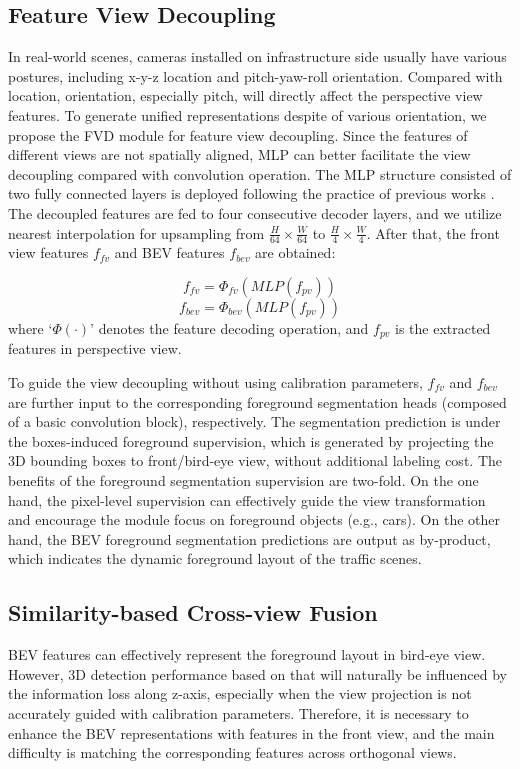 \documentclass[letterpaper, 10 pt, conference]{ieeeconf}
\begin{document}
\subsection{Feature View Decoupling}
In real-world scenes, cameras installed on infrastructure side usually have various postures, including x-y-z location and pitch-yaw-roll orientation. Compared with location, orientation, especially pitch, will directly affect the perspective view features. To generate unified representations despite of various orientation, we propose the FVD module for feature view decoupling. Since the features of different views are not spatially aligned, MLP can better facilitate the view decoupling compared with convolution operation. The MLP structure consisted of two fully connected layers is deployed following the practice of previous works \cite{pan2020cross, pyva}. The decoupled features are fed to four consecutive decoder layers, and we utilize nearest interpolation for upsampling from $\frac{H}{64} \times \frac{W}{64}$ to $\frac{H}{4} \times \frac{W}{4}$. After that, the front view features $f_{fv}$ and BEV features $f_{bev}$ are obtained:

\begin{equation}
  f_{fv} = \Phi_{fv}(\mathit{MLP}(f_{pv}))
\end{equation}
\begin{equation}
  f_{bev} = \Phi_{bev}(\mathit{MLP}(f_{pv}))
\end{equation}
where `$\Phi(\cdot)$' denotes the feature decoding operation, and $f_{pv}$ is the extracted features in perspective view. 

To guide the view decoupling without using calibration parameters, $f_{fv}$ and $f_{bev}$ are further input to the corresponding foreground segmentation heads (composed of a basic convolution block), respectively. The segmentation prediction is under the boxes-induced foreground supervision, which is generated by projecting the 3D bounding boxes to front/bird-eye view, without additional labeling cost. The benefits of the foreground segmentation supervision are two-fold. On the one hand, the pixel-level supervision can effectively guide the view transformation and encourage the module focus on foreground objects (e.g., cars). On the other hand, the BEV foreground segmentation predictions are output as by-product, which indicates the dynamic foreground layout of the traffic scenes.

\subsection{Similarity-based Cross-view Fusion}
BEV features can effectively represent the foreground layout in bird-eye view. However, 3D detection performance based on that will naturally be influenced by the information loss along z-axis, especially when the view projection is not accurately guided with calibration parameters. Therefore, it is necessary to enhance the BEV representations with features in the front view, and the main difficulty is matching the corresponding features across orthogonal views. 
\end{document}
